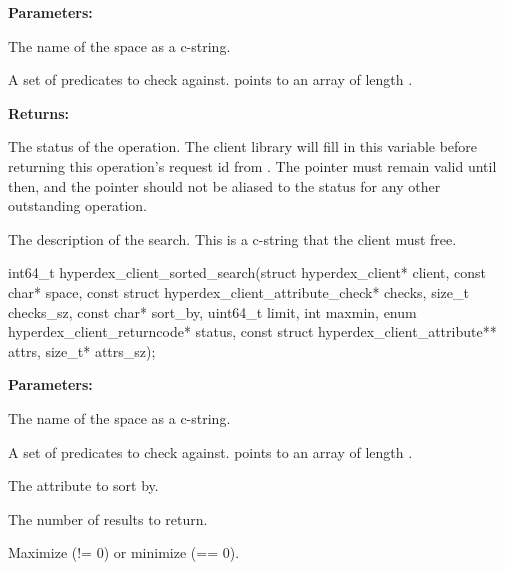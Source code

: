 \noindent\textbf{Parameters:}
\begin{description}[labelindent=\widthof{{\code{checks}, \code{checks\_sz}}},leftmargin=*,noitemsep,nolistsep,align=right]
\item[\code{space}] The name of the space as a c-string.
\item[\code{checks}, \code{checks\_sz}] A set of predicates to check against.   points to an array of length .
\end{description}

\noindent\textbf{Returns:}
\begin{description}[labelindent=\widthof{{\code{description}}},leftmargin=*,noitemsep,nolistsep,align=right]
\item[\code{status}] The status of the operation.  The client library will fill in this variable before returning this operation's request id from .  The pointer must remain valid until then, and the pointer should not be aliased to the status for any other outstanding operation.
\item[\code{description}] The description of the search.  This is a c-string that the client must free.
\end{description}

\funcsep
{}
\begin{ccode}
int64_t hyperdex_client_sorted_search(struct hyperdex_client* client,
                const char* space,
                const struct hyperdex_client_attribute_check* checks, size_t checks_sz,
                const char* sort_by,
                uint64_t limit,
                int maxmin,
                enum hyperdex_client_returncode* status,
                const struct hyperdex_client_attribute** attrs, size_t* attrs_sz);
\end{ccode}
\funcdesc 

\noindent\textbf{Parameters:}
\begin{description}[labelindent=\widthof{{\code{checks}, \code{checks\_sz}}},leftmargin=*,noitemsep,nolistsep,align=right]
\item[\code{space}] The name of the space as a c-string.
\item[\code{checks}, \code{checks\_sz}] A set of predicates to check against.   points to an array of length .
\item[\code{sort\_by}] The attribute to sort by.
\item[\code{limit}] The number of results to return.
\item[\code{maxmin}] Maximize (!= 0) or minimize (== 0).
\end{description}

